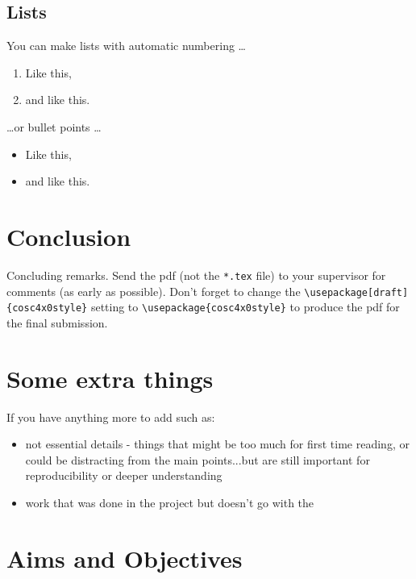 \documentclass[12pt]{article}
\begin{document}
\subsection{Lists}

You can make lists with automatic numbering \dots

\begin{enumerate}
	\item Like this,
	\item and like this.
\end{enumerate}
\dots or bullet points \dots
\begin{itemize}
	\item Like this,
	\item and like this.
\end{itemize}

\section{Conclusion}

Concluding remarks.  Send the pdf (not the \verb$*.tex$ file) to your supervisor for comments (as early as possible).  Don't forget to change the \verb$\usepackage[draft]{cosc4x0style}$ setting to \verb$\usepackage{cosc4x0style}$ to produce the pdf for the final submission.

\printbibliography[title={References}]



\appendix

\renewcommand{\thesection}{Appendix \Alph{section}}

\section{Some extra things}

If you have anything more to add such as:
\begin{itemize}
	\item not essential details - things that might be too much for first time reading, or could be distracting from the main points...but are still important for reproducibility or deeper understanding
	\item work that was done in the project but doesn't go with the
\end{itemize}

\section{Aims and Objectives}
\end{document}
